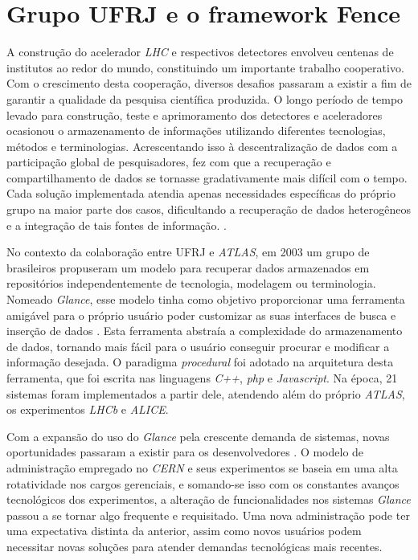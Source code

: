 \section{Grupo UFRJ e o framework Fence}
A construção do acelerador \emph{LHC} e respectivos detectores envolveu centenas de institutos ao redor do mundo, constituindo um importante trabalho cooperativo. Com o crescimento desta cooperação, diversos desafios passaram a existir a fim de garantir a qualidade da pesquisa científica produzida. O longo período de tempo levado para construção, teste e aprimoramento dos detectores e aceleradores ocasionou o armazenamento de informações utilizando diferentes tecnologias, métodos e terminologias. Acrescentando isso à descentralização de dados com a participação global de pesquisadores, fez com que a recuperação e compartilhamento de dados se tornasse gradativamente mais difícil com o tempo. Cada solução implementada atendia apenas necessidades específicas do próprio grupo na maior parte dos casos, dificultando a recuperação de dados heterogêneos e a integração de tais fontes de informação. \cite{grael}.

No contexto da colaboração entre UFRJ e \emph{ATLAS}, em 2003 um grupo de brasileiros propuseram um modelo para recuperar dados armazenados em repositórios independentemente de tecnologia, modelagem ou terminologia. Nomeado \emph{Glance}, esse modelo tinha como objetivo proporcionar uma ferramenta amigável para o próprio usuário poder customizar as suas interfaces de busca e inserção de dados \cite{maidantchik}. Esta ferramenta abstraía a complexidade do armazenamento de dados, tornando mais fácil para o usuário conseguir procurar e modificar a informação desejada. O paradigma \emph{procedural} foi adotado na arquitetura desta ferramenta, que foi escrita nas linguagens \emph{C++}, \emph{php} e \emph{Javascript}. Na época, 21 sistemas foram implementados a partir dele, atendendo além do próprio \emph{ATLAS}, os experimentos \emph{LHCb} e \emph{ALICE}.

Com a expansão do uso do \emph{Glance} pela crescente demanda de sistemas, novas oportunidades passaram a existir para os desenvolvedores \cite{ramos}. O modelo de administração empregado no \emph{CERN} e seus experimentos se baseia em uma alta rotatividade nos cargos gerenciais, e somando-se isso com os constantes avanços tecnológicos dos experimentos, a alteração de funcionalidades nos sistemas \emph{Glance} passou a se tornar algo frequente e requisitado. Uma nova administração pode ter uma expectativa distinta da anterior, assim como novos usuários podem necessitar novas soluções para atender demandas tecnológicas mais recentes.

